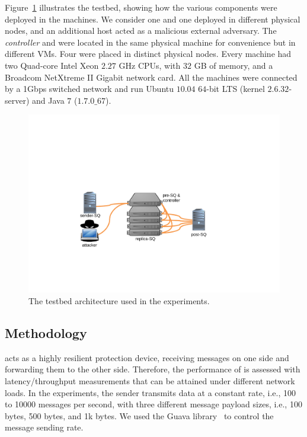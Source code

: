Figure~\ref{fig:testbed} illustrates the testbed, showing how the various \sieveq components were deployed in the machines.
We consider one \sender and one \postsieve deployed in different physical nodes, and an additional host acted as a malicious external adversary.
The \emph{controller} and \presieves were located in the same physical machine for convenience but in different VMs.
Four \repsieves were placed in distinct physical nodes.
Every machine had two Quad-core Intel Xeon $2.27$ GHz CPUs, with $32$ GB of memory, and a Broadcom NetXtreme II Gigabit network card.
All the machines were connected by a 1Gbps switched network and run Ubuntu $10.04$ $64$-bit LTS (kernel $2.6.32$-server) and Java $7$ ($1.7.0\_67$).


\begin{figure}[ht!]
\includegraphics[width=0.8\columnwidth]{images/images/testbed1.pdf}
\caption{The \sieveq testbed architecture used in the experiments.}
\label{fig:testbed}
\end{figure}


\subsection{Methodology}

\sieveq acts as a highly resilient protection device, receiving messages on one side and forwarding them to the other side.
Therefore, the performance of \sieveq is assessed with latency/throughput measurements that can be attained under different network loads. 
In the experiments, the sender transmits data at a constant rate, i.e., 100 to 10000 messages per second, with three different message payload sizes, i.e., 100 bytes, 500 bytes, and 1k bytes.
We used the Guava library~\cite{guava} to control the message sending rate.


